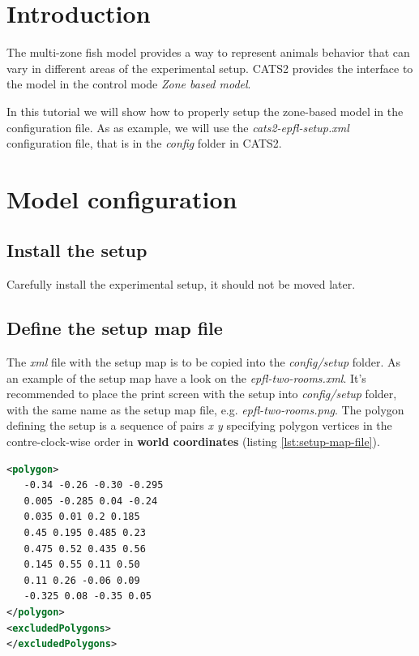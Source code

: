 \documentclass{styles/assisi}
\begin{document}

\lstset{
    language=xml,
    tabsize=3,
    xleftmargin=20pt,
    framexleftmargin=15pt,
    numbers=left,
    numberstyle=\tiny,
    numbersep=5pt,
    breaklines=true,
    showstringspaces=false,
    basicstyle=\footnotesize}

\chapter{Introduction}\label{chap:intro}
The multi-zone fish model provides a way to represent animals behavior that 
can vary in different areas of the experimental setup. CATS2 provides the interface to the model in the control mode {\it Zone based model}.

In this tutorial we will show how to properly setup the zone-based model in the configuration file. As as example, we will use the {\it cats2-epfl-setup.xml} configuration file, that is in the {\it config} folder in CATS2.

\chapter{Model configuration}\label{chap:intro}
\section{Install the setup}
Carefully install the experimental setup, it should not be moved later. 

\section{Define the setup map file}
The {\it xml} file with the setup map is to be copied into the {\it config/setup} folder. As an example of the setup map have a look on the {\it epfl-two-rooms.xml}. It's recommended to place the print screen with the setup into  {\it config/setup} folder, with the same name as the setup map file, e.g. {\it epfl-two-rooms.png}. The polygon defining the setup is a sequence of pairs {\it x y} specifying polygon vertices in the contre-clock-wise order in {\bf world coordinates} (listing \ref{lst:setup-map-file}). 

\begin{lstlisting}[caption={Setup map example from {\it epfl-two-rooms.xml}},label={lst:setup-map-file},language=xml]
<polygon>
   -0.34 -0.26 -0.30 -0.295
   0.005 -0.285 0.04 -0.24
   0.035 0.01 0.2 0.185
   0.45 0.195 0.485 0.23
   0.475 0.52 0.435 0.56
   0.145 0.55 0.11 0.50
   0.11 0.26 -0.06 0.09
   -0.325 0.08 -0.35 0.05
</polygon>
<excludedPolygons>
</excludedPolygons>
\end{lstlisting}
\end{document}
